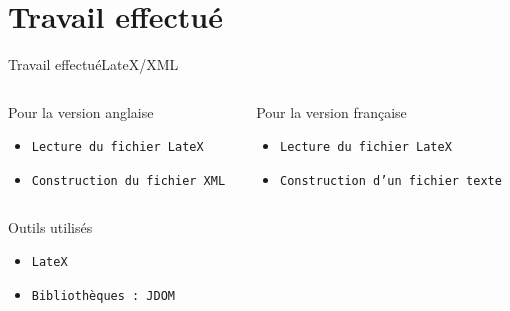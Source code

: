 \documentclass[10pt]{beamer}
\begin{document}
\section{Travail effectué}
\begin{frame}{Travail effectué}{LateX/XML}
	
	\begin{columns}
		\begin{column}{0.5\textwidth}
			\begin{block}{Pour la version anglaise}
				\begin{itemize}
					\item {\tt Lecture du fichier LateX}
	  				\item {\tt Construction du fichier XML}
				\end{itemize}
			\end{block}
		\end{column}
		
		\begin{column}{0.5\textwidth}
			\begin{block}{Pour la version française}
				\begin{itemize}
					\item {\tt Lecture du fichier LateX}
	  				\item {\tt Construction d'un fichier texte}
				\end{itemize}
			\end{block}
		\end{column}
	\end{columns}	
	
	\begin{block}{Outils utilisés}
		\begin{itemize}
			\item {\tt LateX}
			\item {\tt Bibliothèques : JDOM}
		\end{itemize}
	\end{block}		  			
\end{frame}
\end{document}

